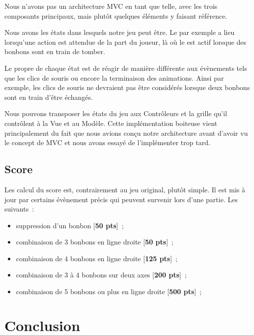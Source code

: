 \documentclass[11pt,a4paper]{article}
\begin{document}
Nous n'avons pas un architecture MVC en tant que telle, avec
les trois composants principaux, mais plutôt quelques éléments y
faisant référence.

Nous avons les états dans lesquels notre jeu
peut être. Le \verb@ReadyState@ par exemple a
lieu lorsqu'une action est attendue de la part du joueur, là
où le \verb@FallState@ est actif lorsque des bonbons sont
en train de tomber.

Le propre de chaque état est de réagir de manière différente
aux évènements tels que les clics de souris ou encore la
terminaison des animations. Ainsi par exemple, les clics de souris ne devraient
pas être considérés lorsque deux bonbons sont en train
d'être échangés.

Nous pouvons transposer les états du jeu aux Contrôleurs et la
grille qu'il contrôlent à la Vue et au Modèle.
Cette implémentation boiteuse vient principalement du fait
que nous avions conçu notre architecture avant d'avoir vu le
concept de MVC et nous avons essayé de l'implémenter trop
tard.

\subsection{Score}

Les calcul du score est, contrairement au jeu original, plutôt simple.
Il est mis à jour par certains évènement précis qui peuvent
survenir lors d'une partie. Les suivants~:

\begin{itemize}
    \item suppression d'un bonbon [\textbf{50 pts}]~;
    \item combinaison de 3 bonbons en ligne droite [\textbf{50 pts}]~;
    \item combinaison de 4 bonbons en ligne droite [\textbf{125 pts}]~;
    \item combinaison de 3 à 4 bonbons sur deux axes [\textbf{200 pts}]~;
    \item combinaison de 5 bonbons ou plus en ligne droite [\textbf{500 pts}]~;
\end{itemize}

\section{Conclusion}
\end{document}

